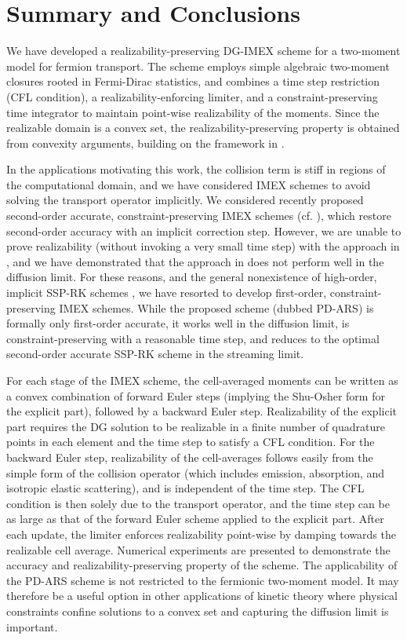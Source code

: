 \section{Summary and Conclusions}
\label{sec:conclusions}

We have developed a realizability-preserving DG-IMEX scheme for a two-moment model for fermion transport.  
The scheme employs simple algebraic two-moment closures rooted in Fermi-Dirac statistics, and combines a time step restriction (CFL condition), a realizability-enforcing limiter, and a constraint-preserving time integrator to maintain point-wise realizability of the moments.  
Since the realizable domain is a convex set, the realizability-preserving property is obtained from convexity arguments, building on the framework in \cite{zhangShu_2010a}.  

In the applications motivating this work, the collision term is stiff in regions of the computational domain, and we have considered IMEX schemes to avoid solving the transport operator implicitly.  
We considered recently proposed second-order accurate, constraint-preserving IMEX schemes (cf. \cite{chertock_etal_2015,hu_etal_2018}), which restore second-order accuracy with an implicit correction step.  
However, we are unable to prove realizability (without invoking a very small time step) with the approach in \cite{chertock_etal_2015}, and we have demonstrated that the approach in \cite{hu_etal_2018} does not perform well in the diffusion limit.  
For these reasons, and the general nonexistence of high-order, implicit SSP-RK schemes \cite{gottlieb_etal_2001}, we have resorted to develop first-order, constraint-preserving IMEX schemes.  
While the proposed scheme (dubbed PD-ARS) is formally only first-order accurate, it works well in the diffusion limit, is constraint-preserving with a reasonable time step, and reduces to the optimal second-order accurate SSP-RK scheme in the streaming limit.  

For each stage of the IMEX scheme, the cell-averaged moments can be written as a convex combination of forward Euler steps (implying the Shu-Osher form for the explicit part), followed by a backward Euler step.  
Realizability of the explicit part requires the DG solution to be realizable in a finite number of quadrature points in each element and the time step to satisfy a CFL condition.  
For the backward Euler step, realizability of the cell-averages follows easily from the simple form of the collision operator (which includes emission, absorption, and isotropic elastic scattering), and is independent of the time step.  
The CFL condition is then solely due to the transport operator, and the time step can be as large as that of the forward Euler scheme applied to the explicit part.  
After each update, the limiter enforces realizability point-wise by damping towards the realizable cell average.  
Numerical experiments are presented to demonstrate the accuracy and realizability-preserving property of the scheme.  
The applicability of the PD-ARS scheme is not restricted to the fermionic two-moment model.  
It may therefore be a useful option in other applications of kinetic theory where physical constraints confine solutions to a convex set and capturing the diffusion limit is important.  

